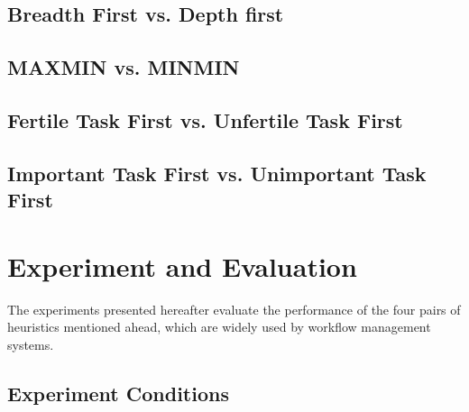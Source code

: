\documentclass[final]{IEEEtran}
\begin{document}
\subsection{Breadth First vs. Depth first}

\subsection{MAXMIN vs. MINMIN}

\subsection{Fertile Task First vs. Unfertile Task First}

\subsection{Important Task First vs. Unimportant Task First}

\section{Experiment and Evaluation}
\label{sec:experiments}

The experiments presented hereafter evaluate the performance of the four pairs of heuristics mentioned ahead, which are widely used by workflow management systems. 

\subsection{Experiment Conditions}
\end{document}
